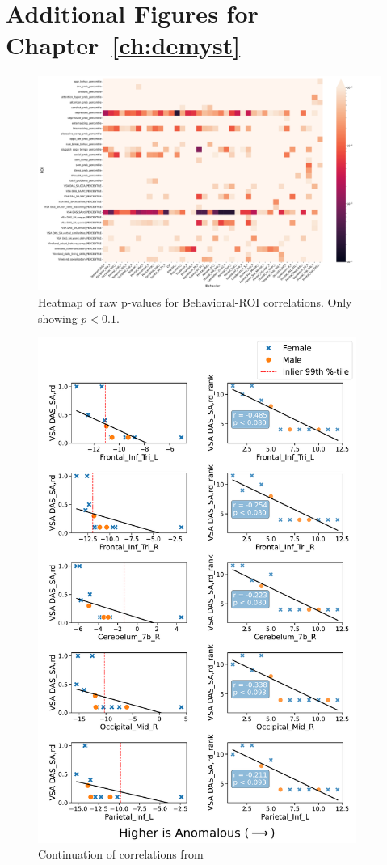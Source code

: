 \chapter{Additional Figures for Chapter~\ref{ch:demyst}}

\begin{figure}[]
\centering
\includegraphics[width=\textwidth, height=0.65\textwidth]{figures/pmatrix.pdf}
\caption{Heatmap of raw p-values for Behavioral-ROI correlations. Only showing $p < 0.1$.}
\label{fig:full-roi-pvals}
\end{figure} 

\begin{figure}[]
\centering
\includegraphics[width=0.93\textwidth, height=1.35\textwidth]{figures/rankcorrplot-fig2.pdf}
\caption{Continuation of correlations from~}
\label{fig:roi-scatter-cont}
\end{figure}

